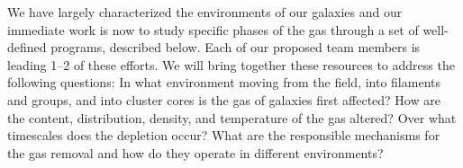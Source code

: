 \documentclass[11pt]{article}
\begin{document}
We have largely characterized the environments of our galaxies and our immediate work is now to study specific phases of the gas through a set of well-defined programs, described below.  Each of our proposed team members is leading 1--2 of these efforts.  We will bring together these resources to address the following questions: In what environment moving from the field, into filaments and groups, and into cluster cores is the gas of galaxies first affected?  How are the content, distribution, density, and temperature of the gas altered?  Over what timescales does the depletion occur?  What are the responsible mechanisms for the gas removal and how do they operate in different environments?  




\end{document}
